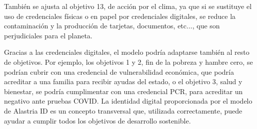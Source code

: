 También se ajusta al objetivo 13, de acción por el clima, ya que si se sustituye el uso de credenciales físicas o en papel por credenciales digitales, se reduce la contaminación y la producción de tarjetas, documentos, etc..., que son perjudiciales para el planeta.

Gracias a las credenciales digitales, el modelo podría adaptarse también al resto de objetivos. Por ejemplo, los objetivos 1 y 2, fin de la pobreza y hambre cero, se podrían cubrir con una credencial de vulnerabilidad económica, que podría acreditar a una familia para recibir ayudas del estado, o el objetivo 3, salud y bienestar, se podría cumplimentar con una credencial PCR, para acreditar un negativo ante pruebas COVID. La identidad digital proporcionada por el modelo de Alastria ID es un concepto transversal que, utilizada correctamente, puede ayudar a cumplir todos los objetivos de desarrollo sostenible.